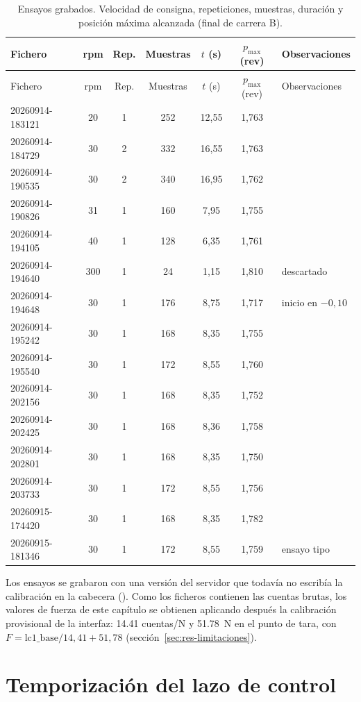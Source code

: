 \begin{longtable}{@{}lcccccl@{}}
\caption{Ensayos grabados. Velocidad de consigna, repeticiones, muestras, duración y posición
máxima alcanzada (final de carrera B).}\label{tab:ensayos}\\
\toprule
Fichero & rpm & Rep. & Muestras & $t$ (s) & $p_{\max}$ (rev) & Observaciones \\
\midrule
\endfirsthead
\toprule
Fichero & rpm & Rep. & Muestras & $t$ (s) & $p_{\max}$ (rev) & Observaciones \\
\midrule
\endhead
20260914-183121 & 20 & 1 & 252 & 12,55 & 1,763 & \\
20260914-184729 & 30 & 2 & 332 & 16,55 & 1,763 & \\
20260914-190535 & 30 & 2 & 340 & 16,95 & 1,762 & \\
20260914-190826 & 31 & 1 & 160 & 7,95 & 1,755 & \\
20260914-194105 & 40 & 1 & 128 & 6,35 & 1,761 & \\
20260914-194640 & 300 & 1 & 24 & 1,15 & 1,810 & descartado \\
20260914-194648 & 30 & 1 & 176 & 8,75 & 1,717 & inicio en $-0{,}10$ \\
20260914-195242 & 30 & 1 & 168 & 8,35 & 1,755 & \\
20260914-195540 & 30 & 1 & 172 & 8,55 & 1,760 & \\
20260914-202156 & 30 & 1 & 168 & 8,35 & 1,752 & \\
20260914-202425 & 30 & 1 & 168 & 8,36 & 1,758 & \\
20260914-202801 & 30 & 1 & 168 & 8,35 & 1,750 & \\
20260914-203733 & 30 & 1 & 172 & 8,55 & 1,756 & \\
20260915-174420 & 30 & 1 & 168 & 8,35 & 1,782 & \\
20260915-181346 & 30 & 1 & 172 & 8,55 & 1,759 & ensayo tipo \\
\bottomrule
\end{longtable}

Los ensayos se grabaron con una versión del servidor que todavía no escribía la calibración en la
cabecera (). Como los ficheros contienen las cuentas brutas, los
valores de fuerza de este capítulo se obtienen aplicando después la calibración provisional de la
interfaz: \num{14.41} cuentas/N y \SI{51.78}{\newton} en el punto de tara, con
$F = \text{lc1\_base}/14{,}41 + 51{,}78$ (sección~\ref{sec:res-limitaciones}).

\section{Temporización del lazo de control}
\label{sec:res-temporizacion}

